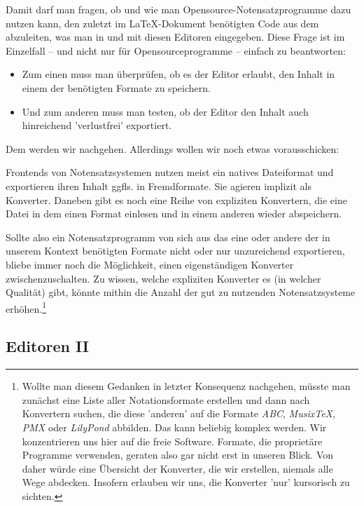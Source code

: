 \documentclass[
  DIV=calc,
  BCOR=5mm,
  11pt,
  headings=small,
  oneside,
  abstract=true,
  toc=bib,
  english,ngerman]{scrartcl}
\begin{document}
Damit darf man fragen, ob und wie man Opensource-Notensatzprogramme dazu nutzen
kann, den zuletzt im \LaTeX-Dokument benötigten Code aus dem abzuleiten, was man
in und mit diesen Editoren eingegeben. Diese Frage ist im Einzelfall -- und
nicht nur für Opensourceprogramme -- einfach zu beantworten:

\begin{itemize}
\item Zum einen muss man überprüfen, ob es der Editor erlaubt, den Inhalt in
einem der benötigten Formate zu speichern.
\item Und zum anderen muss man testen, ob der Editor den Inhalt auch
hinreichend 'verlustfrei' exportiert.
\end{itemize}

Dem werden wir nachgehen. Allerdings wollen wir noch etwas vorausschicken:

Frontends von Notensatzsystemen nutzen meist ein natives Dateiformat und
exportieren ihren Inhalt ggfls. in Fremdformate. Sie agieren implizit als
Konverter. Daneben gibt es noch eine Reihe von expliziten Konvertern, die eine
Datei in dem einen Format einlesen und in einem anderen wieder abspeichern.

Sollte also ein Notensatzprogramm von sich aus das eine oder andere der in
unserem Kontext benötigten Formate nicht oder nur unzureichend exportieren,
bliebe immer noch die Möglichkeit, einen eigenständigen Konverter
zwischenzuschalten. Zu wissen, welche expliziten Konverter es (in welcher
Qualität) gibt, könnte mithin die Anzahl der gut zu nutzenden Notensatzsysteme
erhöhen.\footnote{Wollte man diesem Gedanken in letzter Konsequenz nachgehen,
müsste man zunächst eine Liste aller Notationsformate erstellen und dann nach
Konvertern suchen, die diese 'anderen' auf die Formate \textit{ABC},
\textit{Musix\TeX}, \textit{PMX} oder \textit{LilyPond} abbilden. Das kann beliebig
komplex werden. Wir konzentrieren uns hier auf die freie Software. Formate, die
proprietäre Programme verwenden, geraten also gar nicht erst in unseren Blick.
Von daher würde eine Übersicht der Konverter, die wir erstellen, niemals alle
Wege abdecken. Insofern erlauben wir uns, die Konverter 'nur' kursorisch zu
sichten.}








\subsection{Editoren II}
\end{document}
